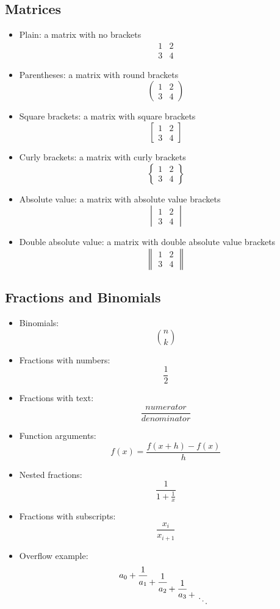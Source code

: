 \documentclass{article}
\newcommand*{\contfrac}[2]{%
{
  \rlap{$\dfrac{1}{\phantom{#1}}$}%
  \genfrac{}{}{0pt}{0}{}{#1+#2}%
}}
\begin{document}
\subsection{Matrices}
\begin{itemize}
    \item Plain: a matrix with no brackets \[\begin{matrix} 1 & 2 \\ 3 & 4 \end{matrix}\]
    \item Parentheses: a matrix with round brackets \[\begin{pmatrix} 1 & 2 \\ 3 & 4 \end{pmatrix}\]
    \item Square brackets: a matrix with square brackets \[\begin{bmatrix} 1 & 2 \\ 3 & 4 \end{bmatrix}\]
    \item Curly brackets: a matrix with curly brackets \[\begin{Bmatrix} 1 & 2 \\ 3 & 4 \end{Bmatrix}\]
    \item Absolute value: a matrix with absolute value brackets \[\begin{vmatrix} 1 & 2 \\ 3 & 4 \end{vmatrix}\]
    \item Double absolute value: a matrix with double absolute value brackets \[\begin{Vmatrix} 1 & 2 \\ 3 & 4 \end{Vmatrix}\]
\end{itemize}


\subsection{Fractions and Binomials}
\begin{itemize}
    \item Binomials: \[\binom{n}{k}\]
    \item Fractions with numbers: \[\frac{1}{2}\]
    \item Fractions with text: \[\frac{numerator}{denominator}\]
    \item Function arguments: \[f(x)=\frac{f(x+h)-f(x)}{h}\]
    \item Nested fractions: \[\frac{1}{1+\frac{1}{x}}\]
    \item Fractions with subscripts: \[\frac{x_{i}}{x_{i+1}}\]
    \item Overflow example: \[
              a_0 +
              \contfrac{a_1}{
                  \contfrac{a_2}{
                      \contfrac{a_3}{
                          \genfrac{}{}{0pt}{0}{}{\ddots}
                      }}}
          \]
\end{itemize}
\end{document}
